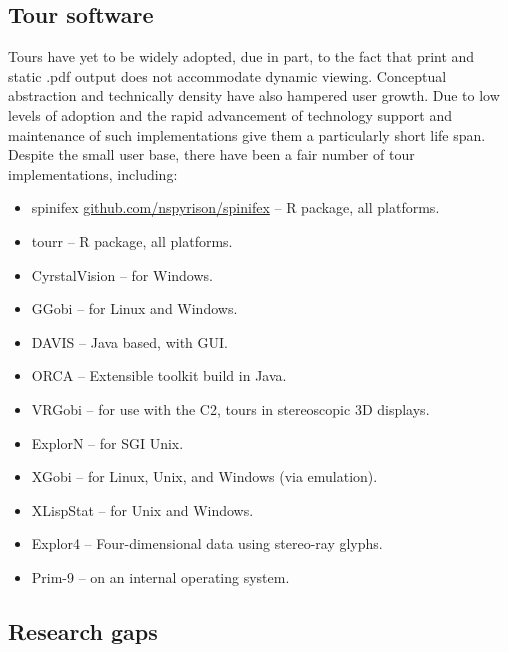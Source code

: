 \documentclass{monashthesis}
\begin{document}
\subsection{Tour software}\label{tour-software}

Tours have yet to be widely adopted, due in part, to the fact that print
and static .pdf output does not accommodate dynamic viewing. Conceptual
abstraction and technically density have also hampered user growth. Due
to low levels of adoption and the rapid advancement of technology
support and maintenance of such implementations give them a particularly
short life span. Despite the small user base, there have been a fair
number of tour implementations, including:

\begin{itemize}
\tightlist
\item
  spinifex
  \href{https://github.com/nspyrison/spinifex}{github.com/nspyrison/spinifex}
  -- R package, all platforms.
\item
  tourr \autocite{wickham_tourr_2011} -- R package, all platforms.
\item
  CyrstalVision \autocite{wegman_visual_2003} -- for Windows.
\item
  GGobi \autocite{swayne_ggobi:_2003} -- for Linux and Windows.
\item
  DAVIS \autocite{huh_davis:_2002} -- Java based, with GUI.
\item
  ORCA \autocite{sutherland_orca:_2000} -- Extensible toolkit build in
  Java.
\item
  VRGobi \autocite{nelson_xgobi_1998} -- for use with the C2, tours in
  stereoscopic 3D displays.
\item
  ExplorN \autocite{carr_explorn:_1996} -- for SGI Unix.
\item
  XGobi \autocite{swayne_xgobi:_1991} -- for Linux, Unix, and Windows
  (via emulation).
\item
  XLispStat \autocite{tierney_lisp-stat:_1990} -- for Unix and Windows.
\item
  Explor4 \autocite{carr_explor4:_1988} -- Four-dimensional data using
  stereo-ray glyphs.
\item
  Prim-9 \autocites{asimov_grand_1985}{fisherkeller_prim-9:_1974} -- on
  an internal operating system.
\end{itemize}

\subsection{Research gaps}\label{research-gaps}
\end{document}
